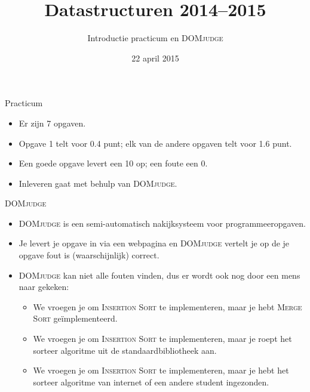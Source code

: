\documentclass[serif,professionalfont]{beamer}
\newcommand{\DOMjudge}{\textsc{DOMjudge}\xspace}
\begin{document}
\title{Datastructuren 2014--2015}
\subtitle{Introductie practicum en \DOMjudge}
\date{22 april 2015}
\maketitle

\begin{frame}{Practicum}

    \begin{itemize}
    
        \item Er zijn 7 opgaven.
        
        \item Opgave 1 telt voor 0.4 punt; elk van de andere opgaven telt voor 1.6 punt.
        \item Een goede opgave levert een 10 op; een foute een 0.
        
        \item Inleveren gaat met behulp van \DOMjudge.
    
    \end{itemize}
    
\end{frame}

\begin{frame}{\DOMjudge}

    \begin{itemize}
    
        \item \DOMjudge is een semi-automatisch nakijksysteem voor programmeeropgaven.
        
        \item Je levert je opgave in via een webpagina en \DOMjudge vertelt je op de je opgave fout is (waarschijnlijk) correct.
        
        \item \DOMjudge kan niet alle fouten vinden, dus er wordt ook nog door een mens naar gekeken:
        
            \begin{itemize}
            
                \item We vroegen je om \textsc{Insertion Sort} te implementeren, maar je hebt \textsc{Merge Sort} ge\"implementeerd.
                
                \item We vroegen je om \textsc{Insertion Sort} te implementeren, maar je roept het sorteer algoritme uit de standaardbibliotheek aan.
                
                \item We vroegen je om \textsc{Insertion Sort} te implementeren, maar je hebt het sorteer algoritme van internet of een andere student ingezonden.
            
            \end{itemize}
    
    \end{itemize}

\end{frame}
\end{document}
